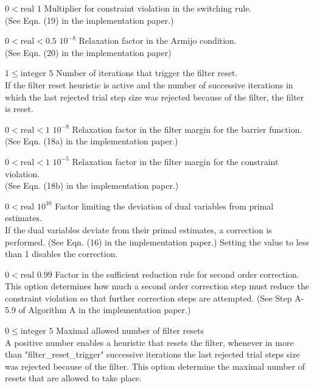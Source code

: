 %
{$0<\textrm{real}$}%
{$1$}%
{Multiplier for constraint violation in the switching rule.\\
(See Eqn. (19) in the implementation paper.)}%
{}

%
{$0<\textrm{real}<0.5$}%
{$10^{- 8}$}%
{Relaxation factor in the Armijo condition.\\
(See Eqn. (20) in the implementation paper)}%
{}

%
{$1\leq\textrm{integer}$}%
{$5$}%
{Number of iterations that trigger the filter reset.\\
If the filter reset heuristic is active and the number of successive iterations in which the last rejected trial step size was rejected because of the filter, the filter is reset.}%
{}

%
{$0<\textrm{real}<1$}%
{$10^{- 8}$}%
{Relaxation factor in the filter margin for the barrier function.\\
(See Eqn. (18a) in the implementation paper.)}%
{}

%
{$0<\textrm{real}<1$}%
{$10^{- 5}$}%
{Relaxation factor in the filter margin for the constraint violation.\\
(See Eqn. (18b) in the implementation paper.)}%
{}

%
{$0<\textrm{real}$}%
{$10^{ 10}$}%
{Factor limiting the deviation of dual variables from primal estimates.\\
If the dual variables deviate from their primal estimates, a correction is performed. (See Eqn. (16) in the implementation paper.) Setting the value to less than 1 disables the correction.}%
{}

%
{$0<\textrm{real}$}%
{$0.99$}%
{Factor in the sufficient reduction rule for second order correction.\\
This option determines how much a second order correction step must reduce the constraint violation so that further correction steps are attempted.  (See Step A-5.9 of Algorithm A in the implementation paper.)}%
{}

%
{$0\leq\textrm{integer}$}%
{$5$}%
{Maximal allowed number of filter resets\\
A positive number enables a heuristic that resets the filter, whenever in more than "filter\_reset\_trigger" successive iterations the last rejected trial steps size was rejected because of the filter.  This option determine the maximal number of resets that are allowed to take place.}%
{}

